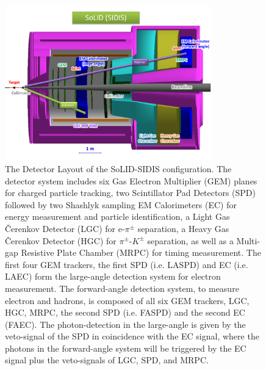 \begin{figure}[!ht]
 \begin{center}
  \includegraphics[width=0.8\textwidth]{./figures/SoLID_SIDIS_setup.pdf}
   \caption[The Detector Layout of the SoLID-SIDIS
     configuration]{\footnotesize{The Detector Layout of the SoLID-SIDIS
       configuration. The detector system includes six Gas Electron Multiplier
       (GEM) planes for charged particle tracking, two Scintillator Pad
       Detectors (SPD) followed by two Shashlyk sampling EM Calorimeters (EC)
       for energy measurement and particle identification, a Light Gas
       \v{C}erenkov Detector (LGC) for e-$\pi^{\pm}$ separation, a Heavy Gas
       \v{C}erenkov Detector (HGC) for $\pi^{\pm}$-$K^{\pm}$ separation, as
       well as a Multi-gap Resistive Plate Chamber (MRPC) for timing
       measurement. The first four GEM trackers, the first SPD (i.e. LASPD) and
       EC (i.e. LAEC) form the large-angle detection system for electron
       measurement. The forward-angle detection system, to measure electron and
       hadrons, is composed of all six GEM trackers, LGC, HGC, MRPC, the second
       SPD (i.e. FASPD) and the second EC (FAEC). The photon-detection in the
       large-angle is given by the veto-signal of the SPD in coincidence with
       the EC signal, where the photons in the forward-angle system will be
       triggered by the EC signal plus the veto-signals of LGC, SPD, and
       MRPC.}}
   \label{solid_sidis}
 \end{center}
\end{figure}

